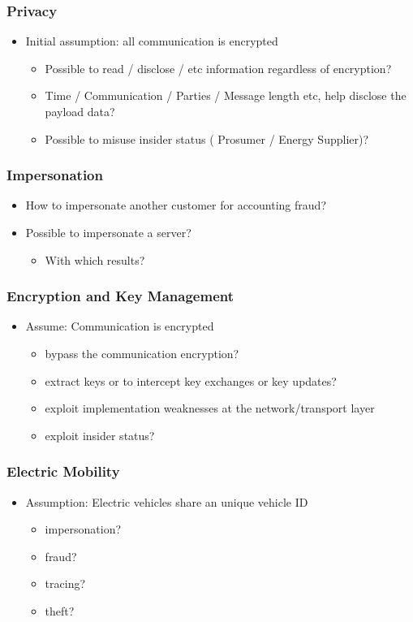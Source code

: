 \documentclass[a4paper, 12pt]{article}
\begin{document}
\subsubsection{Privacy}
\begin{itemize}
\item Initial assumption: all communication is encrypted
\begin{itemize}
\item Possible to read / disclose / etc information regardless of encryption?
\item Time / Communication / Parties / Message length etc, help disclose the payload data?
\item Possible to misuse insider status ( Prosumer / Energy Supplier)?
\end{itemize}
\end{itemize}

\subsubsection{Impersonation}
\begin{itemize}
\item How to impersonate another customer for accounting fraud?
\item Possible to impersonate a server?
\begin{itemize}
\item With which results?
\end{itemize}
\end{itemize}

\subsubsection{Encryption and Key Management}
\begin{itemize}
\item Assume: Communication is encrypted
\begin{itemize}
\item bypass the communication encryption?
\item extract keys or to intercept key exchanges or key updates?
\item exploit implementation weaknesses at the network/transport layer
\item exploit insider status?
\end{itemize}
\end{itemize}

\subsubsection{Electric Mobility}
\begin{itemize}
\item Assumption: Electric vehicles share an unique vehicle ID
\begin{itemize}
\item impersonation?
\item fraud?
\item tracing?
\item theft?
\end{itemize}
\end{itemize}
\end{document}
